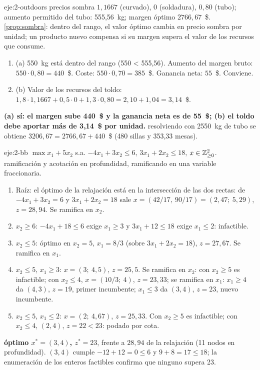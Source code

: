\begin{solucion}{eje:2-outdoors}
\datos precios sombra $1{,}1667$ (curvado), 0 (soldadura), $0{,}80$ (tubo); aumento permitido del tubo: 555,56~kg; margen óptimo $2766{,}67$~\$.
\planteamiento \cref{prop:sombra}: dentro del rango, el valor óptimo cambia en precio sombra por unidad; un producto nuevo compensa si su margen supera el valor de los recursos que consume.
\pasos
\begin{enumerate}[label=\arabic*.]
  \item (a) 550~kg está dentro del rango (550 < 555,56). Aumento del margen bruto: $550\cdot 0{,}80=440$~\$. Coste: $550\cdot 0{,}70=385$~\$. Ganancia neta: $55$~\$. Conviene.
  \item (b) Valor de los recursos del toldo: $1{,}8\cdot 1{,}1667+0{,}5\cdot 0+1{,}3\cdot 0{,}80=2{,}10+1{,}04=3{,}14$~\$.
\end{enumerate}
\resultado \textbf{(a) sí: el margen sube 440~\$ y la ganancia neta es de 55~\$; (b) el toldo debe aportar más de 3,14~\$ por unidad.}
\comprobacion resolviendo con 2550~kg de tubo se obtiene $3206{,}67=2766{,}67+440$~\$ (480 sillas y 353,33 mesas).
\end{solucion}

\begin{solucion}{eje:2-bb}
\datos $\max x_1+5x_2$ s.a. $-4x_1+3x_2\le 6$, $3x_1+2x_2\le 18$, $x\in\mathbb{Z}^{2}_{\ge 0}$.
\planteamiento ramificación y acotación en profundidad, ramificando en una variable fraccionaria.
\pasos
\begin{enumerate}[label=\arabic*.]
  \item Raíz: el óptimo de la relajación está en la intersección de las dos rectas: de $-4x_1+3x_2=6$ y $3x_1+2x_2=18$ sale $x=(42/17,\ 90/17)=(2{,}47;\ 5{,}29)$, $z=28{,}94$. Se ramifica en $x_2$.
  \item $x_2\ge 6$: $-4x_1+18\le 6$ exige $x_1\ge 3$ y $3x_1+12\le 18$ exige $x_1\le 2$: infactible.
  \item $x_2\le 5$: óptimo en $x_2=5$, $x_1=8/3$ (sobre $3x_1+2x_2=18$), $z=27{,}67$. Se ramifica en $x_1$.
  \item $x_2\le 5$, $x_1\ge 3$: $x=(3;\ 4{,}5)$, $z=25{,}5$. Se ramifica en $x_2$: con $x_2\ge 5$ es infactible; con $x_2\le 4$, $x=(10/3;\ 4)$, $z=23{,}33$; se ramifica en $x_1$: $x_1\ge 4$ da $(4,3)$, $z=19$, primer incumbente; $x_1\le 3$ da $(3,4)$, $z=23$, nuevo incumbente.
  \item $x_2\le 5$, $x_1\le 2$: $x=(2;\ 4{,}67)$, $z=25{,}33$. Con $x_2\ge 5$ es infactible; con $x_2\le 4$, $(2,4)$, $z=22<23$: podado por cota.
\end{enumerate}
\resultado \textbf{óptimo $x^{*}=(3,4)$, $z^{*}=23$}, frente a $28{,}94$ de la relajación (11 nodos en profundidad).
\comprobacion $(3,4)$ cumple $-12+12=0\le 6$ y $9+8=17\le 18$; la enumeración de los enteros factibles confirma que ninguno supera 23.
\end{solucion}

